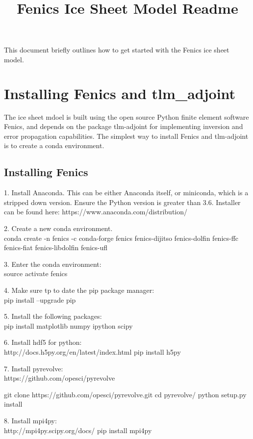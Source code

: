 \documentclass[11pt, reqno, nocenter]{article}
\title{Fenics Ice Sheet Model Readme}
\begin{document}
\maketitle

This document briefly outlines how to get started with the Fenics ice sheet model. 


\section{Installing Fenics and tlm\_adjoint}

The ice sheet mdoel is built using the open source Python finite element software Fenics, and depends on the package tlm-adjoint for implementing inversion and error propagation capabilities. The simplest way to install Fenics and tlm-adjoint is to create a conda environment. 

\subsection{Installing Fenics}
 
1. Install Anaconda. This can be either Anaconda itself, or miniconda, which is a stripped down version. Ensure the Python version is greater than 3.6. Installer can be found here: https://www.anaconda.com/distribution/

2. Create a new conda environment. \\
conda create -n fenics -c conda-forge fenics fenics-dijitso fenics-dolfin fenics-ffc fenics-fiat fenics-libdolfin fenics-ufl

3. Enter the conda environment: \\
source activate fenics

4. Make sure tp to date the pip package manager: \\
pip install --upgrade pip

5. Install the following packages: \\
pip install matplotlib numpy ipython scipy

6. Install hdf5 for python: \\
http://docs.h5py.org/en/latest/index.html
pip install h5py

7. Install pyrevolve: \\
https://github.com/opesci/pyrevolve

git clone https://github.com/opesci/pyrevolve.git
cd pyrevolve/
python setup.py install

8. Install mpi4py: \\
http://mpi4py.scipy.org/docs/
pip install mpi4py
\end{document}

